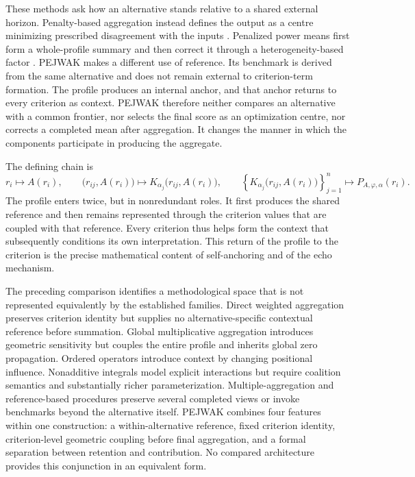 \documentclass[reqno,11pt]{amsart}
\theoremstyle{definition}
\theoremstyle{plain}
\theoremstyle{remark}
\begin{document}
\begin{landscape}
\begin{center}
\begin{tabularx}{\linewidth}{@{}p{3.3cm}p{4.4cm}p{4.8cm}p{4.0cm}X@{}}
\bottomrule
\end{tabularx}
\end{center}
\end{landscape}
\clearpage
These methods ask how an
alternative stands relative to a shared external horizon. Penalty-based
aggregation instead defines the output as a centre minimizing prescribed
disagreement with the inputs \cite{Calvo2010}. Penalized power means first
form a whole-profile summary and then correct it through a
heterogeneity-based factor \cite{Mariani2024}. PEJWAK makes a different
use of reference. Its benchmark is derived from the same alternative and
does not remain external to criterion-term formation. The profile produces
an internal anchor, and that anchor returns to every criterion as context.
PEJWAK therefore neither compares an alternative with a common frontier,
nor selects the final score as an optimization centre, nor corrects a
completed mean after aggregation. It changes the manner in which the
components participate in producing the aggregate.

The defining chain is
\[
r_i
\longmapsto
A(r_i),
\qquad
\bigl(r_{ij},A(r_i)\bigr)
\longmapsto
K_{\alpha_j}\bigl(r_{ij},A(r_i)\bigr),
\qquad
\left\{
K_{\alpha_j}\bigl(r_{ij},A(r_i)\bigr)
\right\}_{j=1}^{n}
\longmapsto
P_{A,\varphi,\alpha}(r_i).
\]
The profile enters twice, but in nonredundant roles. It first produces the
shared reference and then remains represented through the criterion
values that are coupled with that reference. Every criterion thus helps
form the context that subsequently conditions its own interpretation.
This return of the profile to the criterion is the precise mathematical
content of self-anchoring and of the echo mechanism.

The preceding comparison identifies a methodological space that is not
represented equivalently by the established families. Direct weighted
aggregation preserves criterion identity but supplies no
alternative-specific contextual reference before summation. Global
multiplicative aggregation introduces geometric sensitivity but couples
the entire profile and inherits global zero propagation. Ordered
operators introduce context by changing positional influence.
Nonadditive integrals model explicit interactions but require coalition
semantics and substantially richer parameterization. Multiple-aggregation
and reference-based procedures preserve several completed views or invoke
benchmarks beyond the alternative itself. PEJWAK combines four features
within one construction: a within-alternative reference, fixed criterion
identity, criterion-level geometric coupling before final aggregation,
and a formal separation between retention and contribution. No compared
architecture provides this conjunction in an equivalent form.
\end{document}
